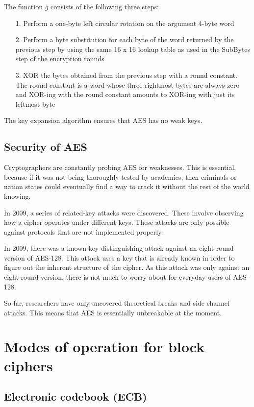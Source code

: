 The function $g$ consists of the following three steps:
\begin{itemize}
	\item[1.] Perform a one-byte left circular rotation on the argument 4-byte word
	\item[2.] Perform a byte substitution for each byte of the word returned by the previous step by using the same 16 x 16 lookup table as used in the SubBytes step of the encryption rounds
	\item[3.] XOR the bytes obtained from the previous step with a round constant. The round constant is a word whose three rightmost bytes are always zero and XOR-ing with the round constant amounts to XOR-ing with just its leftmost byte
\end{itemize}

The key expansion algorithm ensures that AES has no weak keys.

\subsection{Security of AES}
Cryptographers are constantly probing AES for weaknesses. This is essential, because if it was not being thoroughly tested by academics, then criminals or nation states could eventually find a way to crack it without the rest of the world knowing. 


In 2009, a series of related-key attacks were discovered. These involve observing how a cipher operates under different keys. These attacks are only possible against protocols that are not implemented properly.

In 2009, there was a known-key distinguishing attack against an eight round version of AES-128. This attack uses a key that is already known in order to figure out the inherent structure of the cipher. As this attack was only against an eight round version, there is not much to worry about for everyday users of AES-128.

So far, researchers have only uncovered theoretical breaks and side channel attacks. This means that AES is essentially unbreakable at the moment.

\section{Modes of operation for block ciphers}

\subsection{Electronic codebook (ECB)}

